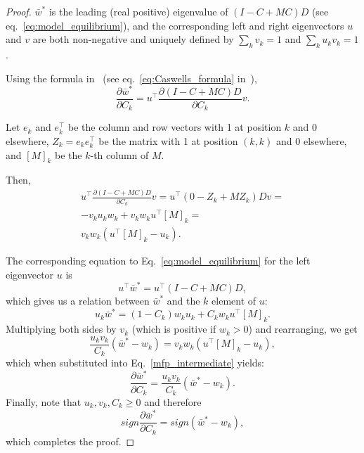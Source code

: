 \documentclass[9pt, a4paper, twocolumn]{extarticle}
\newcommand*{\tr}{^\intercal}
\begin{document}
\begin{proof}
$\bar{w}^*$ is the leading (real positive) eigenvalue of $(I-C+MC)D$ (see eq.~\ref{eq:model_equilibrium}),
and the corresponding left and right eigenvectors $u$ and $v$ are both non-negative and uniquely defined by $\sum_k{v_k} = 1$ and $\sum_k{u_k v_k} = 1$.

Using the formula in~\citet{Caswell1978} (see eq.~\ref{eq:Caswells_formula} in~),
\begin{equation}
\frac{\partial \bar{w}^*}{\partial C_k} = 
u\tr \frac{\partial (I-C+MC)D}{\partial C_k} v.
\end{equation}

Let $e_k$ and $e\tr_k$ be the column and row vectors with 1 at position $k$ and 0 elsewhere, $Z_k = e_k e\tr_k$ be the matrix with 1 at position $(k,k)$ and 0 elsewhere, and $[M]_k$ be the $k$-th column of $M$.

Then,
\begin{equation}\label{mfp_intermediate}
\begin{aligned}
u\tr \frac{\partial (I-C+MC)D}{\partial C_k} v = 
u\tr (0 - Z_k + M Z_k)D v = \\
-v_k u_k w_k + v_k w_k u\tr[M]_k = \\
v_k w_k (u\tr[M]_k - u_k). 
\end{aligned}
\end{equation}

The corresponding equation to Eq.~\ref{eq:model_equilibrium} for the left
eigenvector $u$ is 
\begin{equation}
u\tr \bar{w}^* = u\tr (I - C + MC) D,
\end{equation}
which gives us a relation between $\bar{w}^*$ and the $k$
element of $u$:
\begin{equation}
u_k \bar{w}^* = (1-C_k) w_k u_k + C_k w_k u\tr [M]_k.
\end{equation}
Multiplying both sides by $v_k$ (which is positive if $w_k>0$) and rearranging, we get 
\begin{equation}
\frac{u_k v_k}{C_k} (\bar{w}^* - w_k) = v_k w_k (u\tr [M]_k - u_k),
\end{equation}
which when substituted into Eq.~\ref{mfp_intermediate} yields:
\begin{equation}
\frac{\partial \bar{w}^*}{\partial C_k} = 
\frac{u_k v_k}{C_k} (\bar{w}^* - w_k).
\end{equation}
Finally, note that $u_k, v_k, C_k \ge 0$ and therefore
\begin{equation}
sign \frac{\partial \bar{w}^*}{\partial C_k} = 
sign (\bar{w}^* - w_k),
\end{equation}
which completes the proof.
\end{proof}
\end{document}
